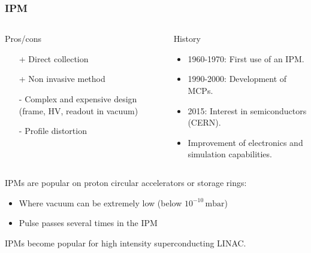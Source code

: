 \begin{frame}[t]
  \frametitle{IPM}
  \begin{columns}[T]
    \begin{column}{0.45\textwidth}
      \begin{block}{Pros/cons}
        \begin{itemize}
          \item[+] Direct collection
          \item[+] Non invasive method
          \item[-] Complex and expensive design (frame, HV, readout in vacuum)
          \item[-] Profile distortion
        \end{itemize}
      \end{block}

    \end{column}
    \begin{column}{0.45\textwidth}
      \begin{block}{History}
        \begin{itemize}
          \item 1960-1970: First use of an IPM.
          \item 1990-2000: Development of MCPs.
          \item 2015: Interest in semiconductors (CERN).
          \item Improvement of electronics and simulation capabilities.
        \end{itemize}
      \end{block}
    \end{column}
  \end{columns}
  \vspace{0.5cm}
  IPMs are popular on proton circular accelerators or storage rings:
  \begin{itemize}
    \item Where vacuum can be extremely low (below $10^{-10}\,\mathrm{mbar}$)
    \item Pulse passes several times in the IPM
  \end{itemize}
  IPMs become popular for high intensity superconducting LINAC.
\end{frame}


